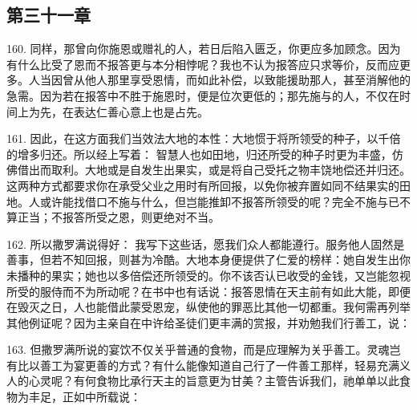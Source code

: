 \subsection{第三十一章}

\par

160. 同样，那曾向你施恩或赠礼的人，若日后陷入匮乏，你更应多加顾念。因为有什么比受了恩而不报答更与本分相悖呢？我也不认为报答应只求等价，反而应更多。人当因曾从他人那里享受恩情，而如此补偿，以致能援助那人，甚至消解他的急需。因为若在报答中不胜于施恩时，便是位次更低的；那先施与的人，不仅在时间上为先，在表达仁善心意上也是占先。\par

161. 因此，在这方面我们当效法大地的本性：大地惯于将所领受的种子，以千倍的增多归还。所以经上写着： 智慧人也如田地，归还所受的种子时更为丰盛，仿佛借出而取利。大地或是自发生出果实，或是将自己受托之物丰饶地偿还并归还。这两种方式都要求你在承受父业之用时有所回报，以免你被弃置如同不结果实的田地。人或许能找借口不施与什么，但岂能推卸不报答所领受的呢？完全不施与已不算正当；不报答所受之恩，则更绝对不当。\par

162. 所以撒罗满说得好： 我写下这些话，愿我们众人都能遵行。服务他人固然是善事，但若不知回报，则甚为冷酷。大地本身便提供了仁爱的榜样：她自发生出你未播种的果实；她也以多倍偿还所领受的。你不该否认已收受的金钱，又岂能忽视所受的服侍而不为所动呢？在书中也有话说：报答恩情在天主前有如此大能，即便在毁灭之日，人也能借此蒙受恩宠，纵使他的罪恶比其他一切都重。我何需再列举其他例证呢？因为主亲自在中许给圣徒们更丰满的赏报，并劝勉我们行善工，说：\par

163. 但撒罗满所说的宴饮不仅关乎普通的食物，而是应理解为关乎善工。灵魂岂有比以善工为宴更善的方式？有什么能像知道自己行了一件善工那样，轻易充满义人的心灵呢？有何食物比承行天主的旨意更为甘美？主管告诉我们，祂单单以此食物为丰足，正如中所载说：\par

